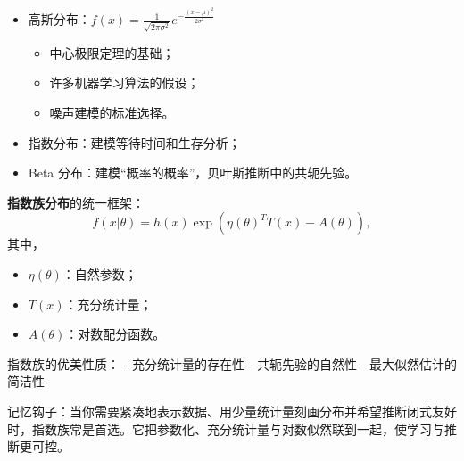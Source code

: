\begin{itemize}
概率论为AI处理不确定性提供了理论基础，是现代机器学习的核心工具。概率与统计贯穿建模、推断与评估：先决定分布假设与结构，再用数据更新信念，最后用不确定性度量指导决策与校准。

\subsubsection{概率分布的深层理解}

概率分布不仅描述随机变量的取值规律，更是建模现实世界复杂性的数学工具。

\textbf{离散分布}：
\begin{itemize}
  \item 伯努利分布：$P(X=1) = p, P(X=0) = 1-p$，建模二分类问题；
  \item 二项分布：$P(X=k) = \binom{n}{k}p^k(1-p)^{n-k}$，建模重复试验；
  \item 多项分布：多分类问题的概率基础；
  \item 泊松分布：$P(X=k) = \frac{\lambda^k e^{-\lambda}}{k!}$，建模稀有事件。
\end{itemize}
 
\textbf{连续分布}：
  \item 高斯分布：$f(x) = \frac{1}{\sqrt{2\pi\sigma^2}}e^{-\frac{(x-\mu)^2}{2\sigma^2}}$
    \begin{itemize}
      \item 中心极限定理的基础；
      \item 许多机器学习算法的假设；
      \item 噪声建模的标准选择。
    \end{itemize}
  \item 指数分布：建模等待时间和生存分析；
  \item Beta 分布：建模“概率的概率”，贝叶斯推断中的共轭先验。
\end{itemize}
 
\textbf{指数族分布}的统一框架：
$$f(x|\theta) = h(x)\exp(\eta(\theta)^T T(x) - A(\theta)),$$
其中，
\begin{itemize}
  \item $\eta(\theta)$：自然参数；
  \item $T(x)$：充分统计量；
  \item $A(\theta)$：对数配分函数。
\end{itemize}
 
指数族的优美性质：
- 充分统计量的存在性
- 共轭先验的自然性
- 最大似然估计的简洁性

记忆钩子：当你需要紧凑地表示数据、用少量统计量刻画分布并希望推断闭式友好时，指数族常是首选。它把参数化、充分统计量与对数似然联到一起，使学习与推断更可控。

